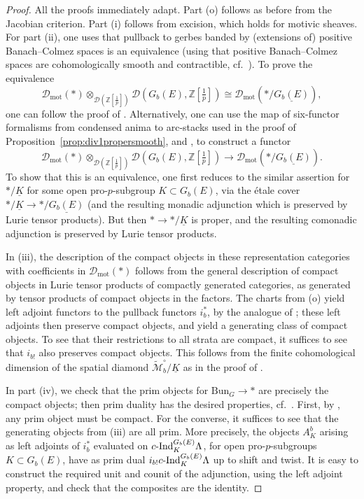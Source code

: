 \documentclass[11pt]{amsart}
\numberwithin{equation}{section}
\numberwithin{theorem}{section}
\theoremstyle{definition}
\begin{document}
\begin{proof} All the proofs immediately adapt. Part (o) follows as before from the Jacobian criterion. Part (i) follows from excision, which holds for motivic sheaves. For part (ii), one uses that pullback to gerbes banded by (extensions of) positive Banach--Colmez spaces is an equivalence (using that positive Banach--Colmez spaces are cohomologically smooth and contractible, cf.~\cite[Proposition V.2.1]{FarguesScholze}). To prove the equivalence
\[
\mathcal D_{\mathrm{mot}}(\ast)\otimes_{\mathcal D(\mathbb Z[\tfrac 1p])} \mathcal D(G_b(E),\mathbb Z[\tfrac 1p])\cong \mathcal D_{\mathrm{mot}}(\ast/\underline{G_b(E)}),
\]
one can follow the proof of \cite[Theorem V.1.1]{FarguesScholze}. Alternatively, one can use the map of six-functor formalisms from condensed anima to arc-stacks used in the proof of Proposition~\ref{prop:div1propersmooth}, and \cite[Proposition 5.1.12]{HeyerMann}, to construct a functor
\[
\mathcal D_{\mathrm{mot}}(\ast)\otimes_{\mathcal D(\mathbb Z[\tfrac 1p])} \mathcal D(G_b(E),\mathbb Z[\tfrac 1p])\to \mathcal D_{\mathrm{mot}}(\ast/\underline{G_b(E)}).
\]
To show that this is an equivalence, one first reduces to the similar assertion for $\ast/\underline{K}$ for some open pro-$p$-subgroup $K\subset G_b(E)$, via the \'etale cover $\ast/\underline{K}\to \ast/\underline{G_b(E)}$ (and the resulting monadic adjunction which is preserved by Lurie tensor products). But then $\ast\to \ast/\underline{K}$ is proper, and the resulting comonadic adjunction is preserved by Lurie tensor products.

In (iii), the description of the compact objects in these representation categories with coefficients in $\mathcal D_{\mathrm{mot}}(\ast)$ follows from the general description of compact objects in Lurie tensor products of compactly generated categories, as generated by tensor products of compact objects in the factors. The charts from (o) yield left adjoint functors to the pullback functors $i_b^\ast$, by the analogue of \cite[Proposition V.4.2]{FarguesScholze}; these left adjoints then preserve compact objects, and yield a generating class of compact objects. To see that their restrictions to all strata are compact, it suffices to see that $i_{b!}$ also preserves compact objects. This follows from the finite cohomological dimension of the spatial diamond $\widetilde{\mathcal M}^\circ_b/\underline{K}$ as in the proof of \cite[Theorem V.4.1]{FarguesScholze}.

In part (iv), we check that the prim objects for $\mathrm{Bun}_G\to \ast$ are precisely the compact objects; then prim duality has the desired properties, cf.~\cite[Proposition 6.8]{ScholzeSixFunctors}. First, by \cite[Proposition 6.16]{ScholzeSixFunctors}, any prim object must be compact. For the converse, it suffices to see that the generating objects from (iii) are all prim. More precisely, the objects $A_K^b$ arising as left adjoints of $i_b^\ast$ evaluated on $c\text-\mathrm{Ind}_K^{G_b(E)} \Lambda$, for open pro-$p$-subgroups $K\subset G_b(E)$, have as prim dual $i_{b!} c\text-\mathrm{Ind}_K^{G_b(E)} \Lambda$ up to shift and twist. It is easy to construct the required unit and counit of the adjunction, using the left adjoint property, and check that the composites are the identity.


\end{proof}
\end{document}
